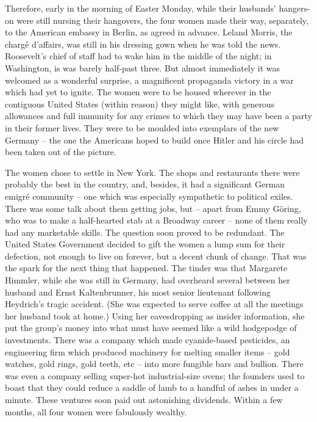 Therefore, early in the morning of Easter Monday, while their husbands' hangers-on were still nursing their hangovers, the four women made their way, separately, to the American embassy in Berlin, as agreed in advance. Leland Morris, the charg\'e d'affairs, was still in his dressing gown when he was told the news. Roosevelt's chief of staff had to wake him in the middle of the night; in Washington, is was barely half-past three. But almost immediately it was welcomed as a wonderful surprise, a magnificent propaganda victory in a war which had yet to ignite. The women were to be housed wherever in the contiguous United States (within reason) they might like, with generous allowances and full immunity for any crimes to which they may have been a party in their former lives. They were to be moulded into exemplars of the new Germany -- the one the Americans hoped to build once Hitler and his circle had been taken out of the picture.

\divsep

The women chose to settle in New York. The shops and restaurants there were probably the best in the country, and, besides, it had a significant German emigr\'e community -- one which was especially sympathetic to political exiles. There was some talk about them getting jobs, but -- apart from Emmy G\"oring, who was to make a half-hearted stab at a Broadway career -- none of them really had any marketable skills. The question soon proved to be redundant. The United States Government decided to gift the women a lump sum for their defection, not enough to live on forever, but a decent chunk of change. That was the spark for the next thing that happened. The tinder was that Margarete Himmler, while she was still in Germany, had overheard several between her husband and Ernst Kaltenbrunner, his most senior lieutenant following Heydrich's tragic accident. (She was expected to serve coffee at all the meetings her husband took at home.) Using her eavesdropping as insider information, she put the group's money into what must have seemed like a wild hodgepodge of investments. There was a company which made cyanide-based pesticides, an engineering firm which produced machinery for melting smaller items -- gold watches, gold rings, gold teeth, etc -- into more fungible bars and bullion. There was even a company selling super-hot industrial-size ovens; the founders used to boast that they could reduce a saddle of lamb to a handful of ashes in under a minute. These ventures soon paid out astonishing dividends. Within a few months, all four women were fabulously wealthy.

